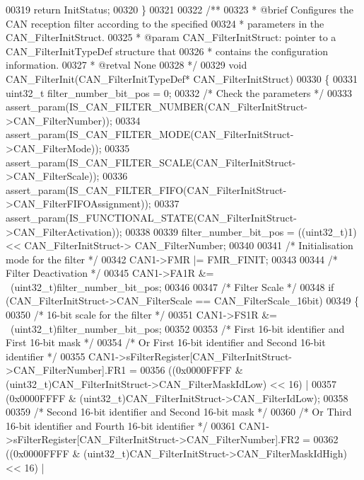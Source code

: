 \begin{DoxyCode}
00319   \textcolor{keywordflow}{return} InitStatus;
00320 \}
00321 
00322 \textcolor{comment}{/**}
00323 \textcolor{comment}{  * @brief  Configures the CAN reception filter according to the specified}
00324 \textcolor{comment}{  *         parameters in the CAN\_FilterInitStruct.}
00325 \textcolor{comment}{  * @param  CAN\_FilterInitStruct: pointer to a CAN\_FilterInitTypeDef structure that}
00326 \textcolor{comment}{  *         contains the configuration information.}
00327 \textcolor{comment}{  * @retval None}
00328 \textcolor{comment}{  */}
00329 \textcolor{keywordtype}{void} CAN_FilterInit(CAN\_FilterInitTypeDef* CAN\_FilterInitStruct)
00330 \{
00331   uint32\_t filter\_number\_bit\_pos = 0;
00332   \textcolor{comment}{/* Check the parameters */}
00333   assert_param(IS\_CAN\_FILTER\_NUMBER(CAN\_FilterInitStruct->CAN\_FilterNumber));
00334   assert_param(IS\_CAN\_FILTER\_MODE(CAN\_FilterInitStruct->CAN\_FilterMode));
00335   assert_param(IS\_CAN\_FILTER\_SCALE(CAN\_FilterInitStruct->CAN\_FilterScale));
00336   assert_param(IS\_CAN\_FILTER\_FIFO(CAN\_FilterInitStruct->CAN\_FilterFIFOAssignment));
00337   assert_param(IS\_FUNCTIONAL\_STATE(CAN\_FilterInitStruct->CAN\_FilterActivation));
00338 
00339   filter\_number\_bit\_pos = ((uint32\_t)1) << CAN\_FilterInitStruct->
      CAN_FilterNumber;
00340 
00341   \textcolor{comment}{/* Initialisation mode for the filter */}
00342   CAN1->FMR |= FMR_FINIT;
00343 
00344   \textcolor{comment}{/* Filter Deactivation */}
00345   CAN1->FA1R &= ~(uint32\_t)filter\_number\_bit\_pos;
00346 
00347   \textcolor{comment}{/* Filter Scale */}
00348   \textcolor{keywordflow}{if} (CAN\_FilterInitStruct->CAN_FilterScale == CAN_FilterScale_16bit)
00349   \{
00350     \textcolor{comment}{/* 16-bit scale for the filter */}
00351     CAN1->FS1R &= ~(uint32\_t)filter\_number\_bit\_pos;
00352 
00353     \textcolor{comment}{/* First 16-bit identifier and First 16-bit mask */}
00354     \textcolor{comment}{/* Or First 16-bit identifier and Second 16-bit identifier */}
00355     CAN1->sFilterRegister[CAN\_FilterInitStruct->CAN\_FilterNumber].FR1 =
00356        ((0x0000FFFF & (uint32\_t)CAN\_FilterInitStruct->CAN\_FilterMaskIdLow) << 16) |
00357         (0x0000FFFF & (uint32\_t)CAN\_FilterInitStruct->CAN\_FilterIdLow);
00358 
00359     \textcolor{comment}{/* Second 16-bit identifier and Second 16-bit mask */}
00360     \textcolor{comment}{/* Or Third 16-bit identifier and Fourth 16-bit identifier */}
00361     CAN1->sFilterRegister[CAN\_FilterInitStruct->CAN\_FilterNumber].FR2 =
00362        ((0x0000FFFF & (uint32\_t)CAN\_FilterInitStruct->CAN\_FilterMaskIdHigh) << 16) |

\end{DoxyCode}
